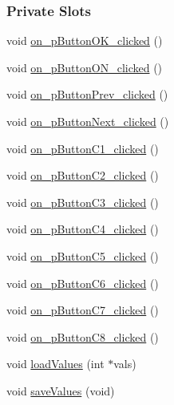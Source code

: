 \subsubsection*{Private Slots}
\begin{DoxyCompactItemize}
\item 
void \mbox{\hyperlink{classCyclesDialog_a5e6a1c6ccd9ad82de8f0ecdc8b3e064a}{on\+\_\+p\+Button\+O\+K\+\_\+clicked}} ()
\item 
void \mbox{\hyperlink{classCyclesDialog_a6f7d5b5e90af9ba725ac2432f5490d92}{on\+\_\+p\+Button\+O\+N\+\_\+clicked}} ()
\item 
void \mbox{\hyperlink{classCyclesDialog_a1e4ad2ee11ec162987d24e2071c3f5c4}{on\+\_\+p\+Button\+Prev\+\_\+clicked}} ()
\item 
void \mbox{\hyperlink{classCyclesDialog_a2f918e498a7c5cd77b12edb6923fb78d}{on\+\_\+p\+Button\+Next\+\_\+clicked}} ()
\item 
void \mbox{\hyperlink{classCyclesDialog_a0ce26519321c0a05a2829861468575b8}{on\+\_\+p\+Button\+C1\+\_\+clicked}} ()
\item 
void \mbox{\hyperlink{classCyclesDialog_ab71f6eda48eafb78e6c57ad91855b2ae}{on\+\_\+p\+Button\+C2\+\_\+clicked}} ()
\item 
void \mbox{\hyperlink{classCyclesDialog_a85b601531f06911a6e3ebacafdfd44cf}{on\+\_\+p\+Button\+C3\+\_\+clicked}} ()
\item 
void \mbox{\hyperlink{classCyclesDialog_a46d7c69940f9359064611b836c39e09c}{on\+\_\+p\+Button\+C4\+\_\+clicked}} ()
\item 
void \mbox{\hyperlink{classCyclesDialog_ab25cdb8d2757b90a2a041e132a8f62fe}{on\+\_\+p\+Button\+C5\+\_\+clicked}} ()
\item 
void \mbox{\hyperlink{classCyclesDialog_a261ffb4571e95cc74ad443d38edf4194}{on\+\_\+p\+Button\+C6\+\_\+clicked}} ()
\item 
void \mbox{\hyperlink{classCyclesDialog_a84f771b37567f71fc3012dbcd2bd56e5}{on\+\_\+p\+Button\+C7\+\_\+clicked}} ()
\item 
void \mbox{\hyperlink{classCyclesDialog_aca041160847e154ae7ad73a8dc90501d}{on\+\_\+p\+Button\+C8\+\_\+clicked}} ()
\item 
void \mbox{\hyperlink{classCyclesDialog_ad25bef71c8a2219252c1458fa333a376}{load\+Values}} (int $\ast$vals)
\item 
void \mbox{\hyperlink{classCyclesDialog_a26c86ed543a9345f230fb8925ccae5d9}{save\+Values}} (void)
\end{DoxyCompactItemize}
